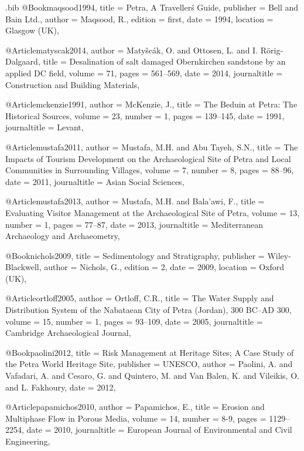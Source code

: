 \begin{filecontents}{\IJSRAidentifier.bib}
@Book{maqsood1994,
  title     = {Petra, A Travellerś Guide},
  publisher = {Bell and Bain Ltd.},
  author    = {Maqsood, R.},
  edition   = {first},
  date      = {1994},
  location  = {Glasgow (UK)},
}

@Article{matyscak2014,
  author       = {Matyšcák, O. and Ottosen, L. and I. Rörig-Dalgaard},
  title        = {Desalination of salt damaged Obernkirchen sandstone by an applied DC field},
  volume       = {71},
  pages        = {561--569},
  date         = {2014},
  journaltitle = {Construction and Building Materials},
}

@Article{mckenzie1991,
	author       = {McKenzie, J.},
	title        = {The Beduin at Petra: The Historical Sources},
	volume       = {23},
	number       = {1},
	pages        = {139--145},
	date         = {1991},
	journaltitle = {Levant},
}

@Article{mustafa2011,
	author       = {Mustafa, M.H. and Abu Tayeh, S.N.},
	title        = {The Impacts of Tourism Development on the Archaeological Site of Petra and Local Communities in Surrounding Villages},
	volume       = {7},
	number       = {8},
	pages        = {88--96},
	date         = {2011},
	journaltitle = {Asian Social Sciences},
}

@Article{mustafa2013,
  author       = {Mustafa, M.H. and Bala’awi, F.},
  title        = {Evaluating Visitor Management at the Archaeological Site of Petra},
  volume       = {13},
  number       = {1},
  pages        = {77--87},
  date         = {2013},
  journaltitle = {Mediterranean Archaeology and Archaeometry},
}

@Book{nichols2009,
  title     = {Sedimentology and Stratigraphy},
  publisher = {Wiley-Blackwell},
  author    = {Nichols, G.},
  edition   = {2},
  date      = {2009},
  location  = {Oxford (UK)},
}

@Article{ortloff2005,
  author       = {Ortloff, C.R.},
  title        = {The Water Supply and Distribution System of the Nabataean City of Petra (Jordan), 300 BC–AD 300},
  volume       = {15},
  number       = {1},
  pages        = {93--109},
  date         = {2005},
  journaltitle = {Cambridge Archaeological Journal},
}

@Book{paolini2012,
  title     = {Risk Management at Heritage Sites; A Case Study of the Petra World Heritage Site},
  publisher = {UNESCO},
  author    = {Paolini, A. and Vafadari, A. and Cesaro, G. and Quintero, M. and Van Balen, K. and Vileikis, O. and L. Fakhoury},
  date      = {2012},
}

@Article{papamichos2010,
  author       = {Papamichos, E.},
  title        = {Erosion and Multiphase Flow in Porous Media},
  volume       = {14},
  number       = {8-9},
  pages        = {1129--2254},
  date         = {2010},
  journaltitle = {European Journal of Environmental and Civil Engineering},
}


\end{filecontents}
